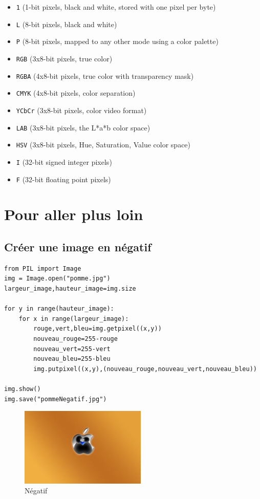 \documentclass[11pt]{article}
\begin{document}
\begin{itemize}
\item \texttt{1} (1-bit pixels, black and white, stored with one pixel per byte)
\item \texttt{L} (8-bit pixels, black and white)
\item \texttt{P} (8-bit pixels, mapped to any other mode using a color palette)
\item \texttt{RGB} (3x8-bit pixels, true color)
\item \texttt{RGBA} (4x8-bit pixels, true color with transparency mask)
\item \texttt{CMYK} (4x8-bit pixels, color separation)
\item \texttt{YCbCr} (3x8-bit pixels, color video format)
\item \texttt{LAB} (3x8-bit pixels, the L*a*b color space)
\item \texttt{HSV} (3x8-bit pixels, Hue, Saturation, Value color space)
\item \texttt{I} (32-bit signed integer pixels)
\item \texttt{F} (32-bit floating point pixels)
\end{itemize}



\section{Pour aller plus loin}
\label{sec:org5da2b97}

\subsection{Créer une image en négatif}
\label{sec:orgaf1648e}

\begin{verbatim}
from PIL import Image
img = Image.open("pomme.jpg")
largeur_image,hauteur_image=img.size

for y in range(hauteur_image):
    for x in range(largeur_image):
        rouge,vert,bleu=img.getpixel((x,y))
        nouveau_rouge=255-rouge
        nouveau_vert=255-vert
        nouveau_bleu=255-bleu
        img.putpixel((x,y),(nouveau_rouge,nouveau_vert,nouveau_bleu))

img.show()
img.save("pommeNegatif.jpg")
\end{verbatim}

\begin{figure}[htbp]
\centering
\includegraphics[width=6cm]{pommeNegatif.jpg}
\caption{Négatif}
\end{figure}
\end{document}
